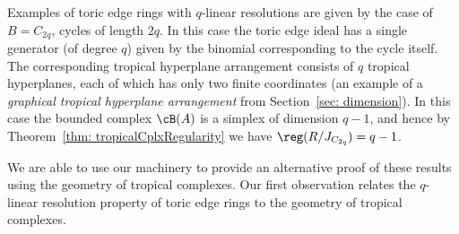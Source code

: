 \begin{example}
Examples of toric edge rings with $q$-linear resolutions are given by the case of $B = C_{2q}$, cycles of length $2q$.  In this case the toric edge ideal has a single generator (of degree $q$) given by the binomial corresponding to the cycle itself.  The corresponding tropical hyperplane arrangement consists of $q$ tropical hyperplanes, each of which has only two finite coordinates (an example of a \emph{graphical tropical hyperplane arrangement} from Section~\ref{sec: dimension}). In this case the bounded complex $\cB(A)$ is a simplex of dimension $q-1$, and hence by Theorem~\ref{thm: tropicalCplxRegularity} we have $\reg(R/J_{C_{2q}}) = q-1$.
\end{example}

We are able to use our machinery to provide an alternative proof of these results using the geometry of tropical complexes.  Our first observation relates the $q$-linear resolution property of toric edge rings to the geometry of tropical complexes.

